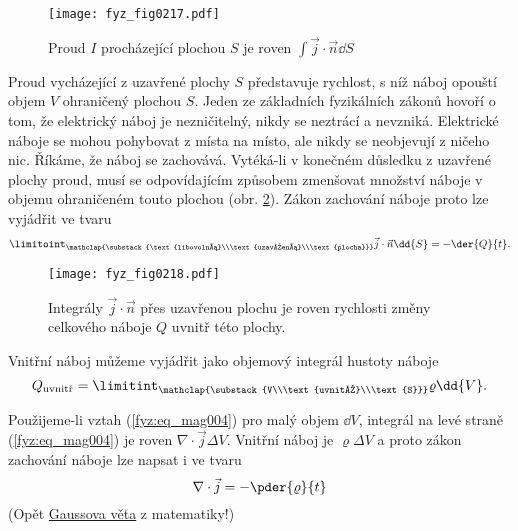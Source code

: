       \begin{figure}[ht!]
        \centering
        \texttt{[image: fyz\_fig0217.pdf]}
        \caption{Proud \(I\) procházející plochou \(S\) je roven \(\int\vec{j}\cdot\vec{n}\dd{S}\)}
        \label{fyz:fig0217} 
      \end{figure}
      Proud vycházející z uzavřené plochy \(S\) představuje rychlost, s níž náboj opouští objem 
      \(V\) ohraničený plochou \(S\). Jeden ze základních fyzikálních zákonů hovoří o tom, že 
      elektrický náboj je nezničitelný, nikdy se neztrácí a nevzniká. Elektrické náboje se mohou 
      pohybovat z místa na místo, ale nikdy se neobjevují z ničeho nic. Říkáme, že náboj se 
      zachovává. Vytéká-li v konečném důsledku z uzavřené plochy proud, musí se odpovídajícím 
      způsobem zmenšovat množství náboje v objemu ohraničeném touto plochou (obr. 
      \ref{fyz:fig0218}). Zákon zachování náboje proto lze vyjádřit ve tvaru
      \begin{equation}\label{fyz:eq_mag004} 
        \limitoint_{\mathclap{\substack{\text{libovolná}\\\text{uzavřená}\\\text{plocha}}}}
        \vec{j}\cdot\vec{n}\dd{S} = -\der{Q}{t}.
      \end{equation} 
      \begin{figure}[ht!]
        \centering
        \texttt{[image: fyz\_fig0218.pdf]}
        \caption{Integrály \(\vec{j}\cdot\vec{n}\) přes uzavřenou plochu je roven rychlosti změny 
                 celkového náboje \(Q\) uvnitř této plochy.}
        \label{fyz:fig0218} 
      \end{figure}
      Vnitřní náboj můžeme vyjádřit jako objemový integrál hustoty náboje
      \begin{equation}\label{fyz:eq_mag005} 
        Q_{\text{uvnitř}} = 
         \limitint_{\mathclap{\substack{V\\\text{uvnitř}\\\text{S}}}}\varrho\dd{V}.
      \end{equation}
      
      Použijeme-li vztah (\ref{fyz:eq_mag004}) pro malý objem \(\dd{V}\), integrál na levé straně 
      (\ref{fyz:eq_mag004}) je roven \(\nabla\cdot\vec{j}\Delta V\). Vnitřní náboj je 
      \(\varrho\Delta V\) a proto zákon zachování náboje lze napsat i ve tvaru
      \begin{equation}\label{fyz:eq_mag006}    %
        \nabla\cdot\vec{j} = -\pder{\varrho}{t}
      \end{equation}
      (Opět \hyperlink{fyz:IIchapIIIsecIII}{Gaussova věta} z matematiky!)

